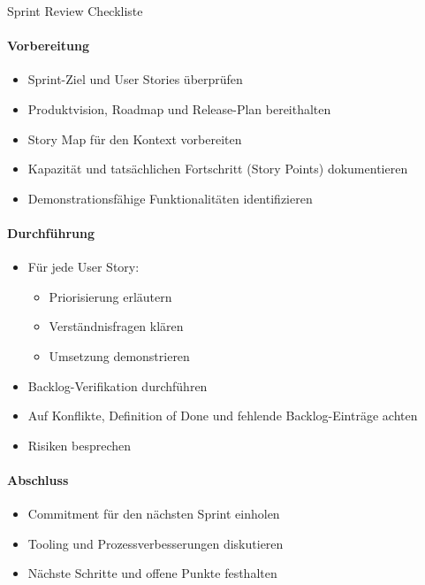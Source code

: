 \begin{KR}{Sprint Review Checkliste}\\
    \paragraph{Vorbereitung}
    \begin{itemize}
        \item Sprint-Ziel und User Stories überprüfen
        \item Produktvision, Roadmap und Release-Plan bereithalten
        \item Story Map für den Kontext vorbereiten
        \item Kapazität und tatsächlichen Fortschritt (Story Points) dokumentieren
        \item Demonstrationsfähige Funktionalitäten identifizieren
    \end{itemize}
    
    \paragraph{Durchführung}
    \begin{itemize}
        \item Für jede User Story:
        \begin{itemize}
            \item Priorisierung erläutern
            \item Verständnisfragen klären
            \item Umsetzung demonstrieren
        \end{itemize}
        \item Backlog-Verifikation durchführen
        \item Auf Konflikte, Definition of Done und fehlende Backlog-Einträge achten
        \item Risiken besprechen
    \end{itemize}
    
    \paragraph{Abschluss}
    \begin{itemize}
        \item Commitment für den nächsten Sprint einholen
        \item Tooling und Prozessverbesserungen diskutieren
        \item Nächste Schritte und offene Punkte festhalten
    \end{itemize}
\end{KR}

